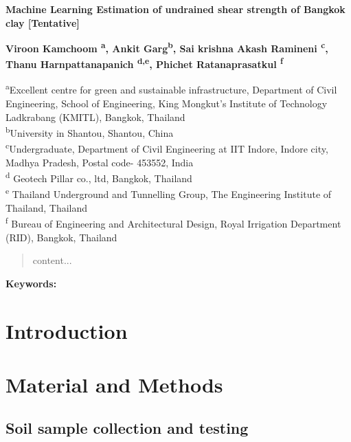 \documentclass[12pt,a4paper]{article}
\begin{document}
	
	\begin{justify}
		\textbf{\Large
			Machine Learning Estimation of undrained shear strength of Bangkok clay [Tentative] 
		}
	\end{justify}
	
	\begin{flushleft}
		\textbf{Viroon Kamchoom  \textsuperscript{a}, Ankit Garg\textsuperscript{b}, Sai krishna Akash Ramineni \textsuperscript{c}, Thanu Harnpattanapanich \textsuperscript{d,e}, Phichet Ratanaprasatkul \textsuperscript{f}}
	\end{flushleft}
	
	\begin{flushleft}
		{\tiny {\textsuperscript{a}Excellent centre for green and sustainable infrastructure, Department of Civil Engineering, School of Engineering, King Mongkut's Institute of Technology Ladkrabang (KMITL), Bangkok, Thailand \\ 
				\textsuperscript{b}University in Shantou, Shantou, China \\ 
				\textsuperscript{c}Undergraduate, Department of Civil Engineering at IIT Indore, Indore city, Madhya Pradesh, Postal code- 453552, India \\
				\textsuperscript{d} Geotech Pillar co., ltd, Bangkok, Thailand \\
				\textsuperscript{e} Thailand Underground and Tunnelling Group, The Engineering Institute of Thailand, Thailand \\
				\textsuperscript{f} Bureau of Engineering and Architectural Design, Royal Irrigation Department (RID), Bangkok, Thailand \\
		}}
	\end{flushleft}
	
	\begin{abstract}
		content...
	\end{abstract}
	
	\hspace{0.4cm} \textbf{Keywords:} 
	
	\section{Introduction}
	
	\section{Material and Methods}
	
	\subsection{Soil sample collection and testing}
	
\end{document}
